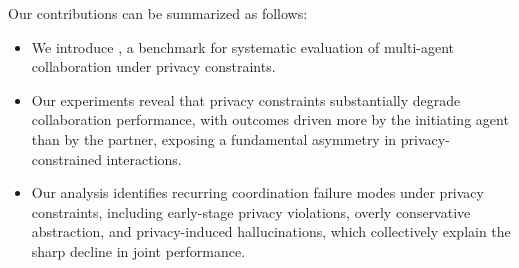 Our contributions can be summarized as follows:
\begin{itemize}
    \item We introduce \ours, a benchmark for systematic evaluation of multi-agent collaboration under privacy constraints.
    \item Our experiments reveal that privacy constraints substantially degrade collaboration performance, with outcomes driven more by the initiating agent than by the partner, exposing a fundamental asymmetry in privacy-constrained interactions.
    \item Our analysis identifies recurring coordination failure modes under privacy constraints, including early-stage privacy violations, overly conservative abstraction, and privacy-induced hallucinations, which collectively explain the sharp decline in joint performance.
\end{itemize}
